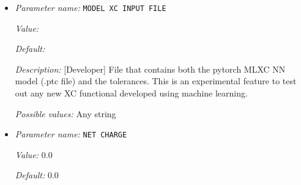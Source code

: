 \begin{itemize}
{\it Description:} [Standard] Parameter specifying the type of exchange-correlation to be used: LDA-PZ (Perdew Zunger Ceperley Alder correlation with Slater Exchange[PRB. 23, 5048 (1981)]), LDA-PW (Perdew-Wang 92 functional with Slater Exchange [PRB. 45, 13244 (1992)]), LDA-VWN (Vosko, Wilk \& Nusair with Slater Exchange[Can. J. Phys. 58, 1200 (1980)]), GGA-PBE (Perdew-Burke-Ernzerhof functional [PRL. 77, 3865 (1996)]), GGA-RPBE (RPBE: B. Hammer, L. B. Hansen, and J. K. Nørskov, Phys. Rev. B 59, 7413 (1999)), GGA-LBxPBEc van Leeuwen \& Baerends exchange [Phys. Rev. A 49, 2421 (1994)] with  PBE correlation [Phys. Rev. Lett. 77, 3865 (1996)], MLXC-NNLDA (LDA-PW + NN-LDA), MLXC-NNGGA (GGA-PBE + NN-GGA), MLXC-NNLLMGGA (GGA-PBE + NN Laplacian level MGGA), MGGA-SCAN (Strongly Constrained and Appropriately Normed functional [Phys. Rev. Lett. 115, 03640 (2015)]), MGGA-R2SCAN (regularized-restored SCAN [J. Phys. Chem. Lett. 19, 8208-8215 (2020)]). Caution: MLXC options are experimental. Add +U to use hubbard correction


{\it Possible values:} Any one of LDA-PZ, LDA-PW, LDA-VWN, GGA-PBE, GGA-RPBE, GGA-LBxPBEc, MLXC-NNLDA, MLXC-NNGGA, MLXC-NNLLMGGA, LDA-PZ+U, LDA-PW+U, LDA-VWN+U, GGA-PBE+U, GGA-RPBE+U, GGA-LBxPBEc+U, MLXC-NNLDA+U, MLXC-NNGGA+U, MLXC-NNLLMGGA+U, MGGA-SCAN, MGGA-R2SCAN
\item {\it Parameter name:} {\tt MODEL XC INPUT FILE}
\label{parameters:DFT functional parameters/MODEL XC INPUT FILE}
\label{parameters:DFT_20functional_20parameters/MODEL_20XC_20INPUT_20FILE}


{\it Value:} 


{\it Default:} 


{\it Description:} [Developer] File that contains both the pytorch MLXC NN model (.ptc file) and the tolerances. This is an experimental feature to test out any new XC functional developed using machine learning.


{\it Possible values:} Any string
\item {\it Parameter name:} {\tt NET CHARGE}
\label{parameters:DFT functional parameters/NET CHARGE}
\label{parameters:DFT_20functional_20parameters/NET_20CHARGE}


{\it Value:} 0.0


{\it Default:} 0.0



\end{itemize}
